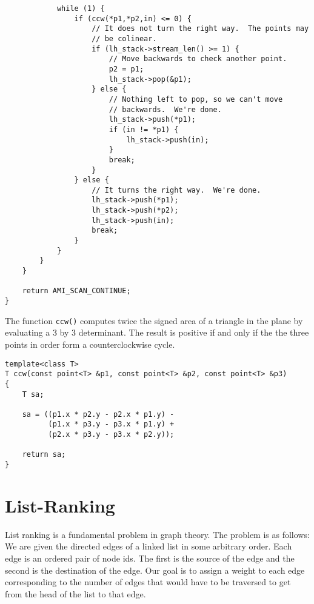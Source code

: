\begin{verbatim}
            while (1) {                
                if (ccw(*p1,*p2,in) <= 0) {
                    // It does not turn the right way.  The points may
                    // be colinear.
                    if (lh_stack->stream_len() >= 1) {
                        // Move backwards to check another point.
                        p2 = p1;
                        lh_stack->pop(&p1);
                    } else {
                        // Nothing left to pop, so we can't move
                        // backwards.  We're done.
                        lh_stack->push(*p1);
                        if (in != *p1) {
                            lh_stack->push(in);
                        }
                        break;
                    }
                } else {
                    // It turns the right way.  We're done.
                    lh_stack->push(*p1);
                    lh_stack->push(*p2);
                    lh_stack->push(in);
                    break;
                }
            }
        }       
    }

    return AMI_SCAN_CONTINUE;    
}
\end{verbatim}

The function \verb|ccw()| computes twice the signed area of a triangle in
the plane by evaluating a 3 by 3 determinant.  The result is positive
if and only if the the three points in order form a counterclockwise
cycle.

\begin{verbatim}
template<class T>
T ccw(const point<T> &p1, const point<T> &p2, const point<T> &p3)
{
    T sa;
    
    sa = ((p1.x * p2.y - p2.x * p1.y) -
          (p1.x * p3.y - p3.x * p1.y) +
          (p2.x * p3.y - p3.x * p2.y));

    return sa;
}
\end{verbatim}

\section{List-Ranking}
\label{sec:list-ranking}

List ranking is a fundamental problem in graph theory.  The problem is
as follows: We are given the directed edges of a linked list in some
arbitrary order.  Each edge is an ordered pair of node ids.  The first
is the source of the edge and the second is the destination of the
edge.  Our goal is to assign a weight to each edge corresponding to
the number of edges that would have to be traversed to get from the
head of the list to that edge.

